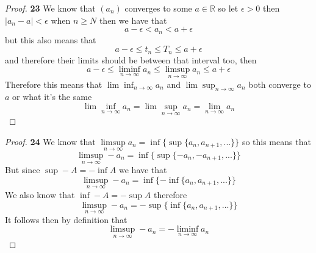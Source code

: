 \documentclass[11pt]{article}
\newcommand{\R}{\mathbb{R}}
\theoremstyle{definition}
\begin{document}
    \begin{proof}{\textbf{23}}
        We know that $(a_n)$ converges to some $a \in \R$ so let $\epsilon >0$ then
        $|a_n - a |<\epsilon$ when $n \geq N$ then we have that
        $$a-\epsilon<a_n<a+\epsilon$$
        but this also means that
        $$a-\epsilon\leq t_n\leq T_n \leq a+\epsilon$$
        and therefore their limits should be between that interval too, then
        $$a-\epsilon \leq \liminf_{n \to \infty} a_n \leq \limsup_{n \to \infty} a_n  \leq a+\epsilon$$
        Therefore this means that $\lim\inf_{n \to \infty} a_n$ and
        $\lim\sup_{n \to \infty} a_n$ both converge to $a$ or what it's the same
        $$\lim\inf_{n \to \infty} a_n = \lim\sup_{n \to \infty} a_n = \lim_{n \to \infty} a_n$$
    \end{proof}
    \begin{proof}{\textbf{24}}
        We know that 
        $\limsup\limits_{n \to \infty} a_n = \inf\{\sup\{a_n, a_{n+1}, ...\}\}$
        so this means that 
        $$\limsup\limits_{n \to \infty} -a_n = \inf\{\sup\{-a_n, -a_{n+1}, ...\}\}$$
        But since $\sup -A = -\inf A$ we have that
        $$\limsup\limits_{n \to \infty} -a_n = \inf\{-\inf\{a_n, a_{n+1}, ...\}\}$$
        We also know that $\inf -A = -\sup A$ therefore
        $$\limsup\limits_{n \to \infty} -a_n = -\sup\{\inf\{a_n, a_{n+1}, ...\}\}$$
        It follows then by definition that
        $$\limsup\limits_{n \to \infty} -a_n = -\liminf\limits_{n \to \infty} a_n$$
    \end{proof}
\cleardoublepage
\end{document}
